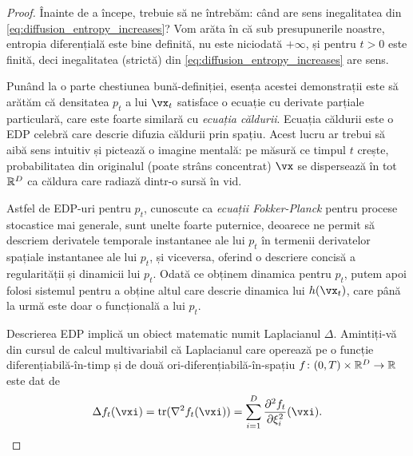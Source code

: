 \documentclass[../../book-main_ro.tex]{subfiles}
\begin{document}
\begin{proof}
    Înainte de a începe, trebuie să ne întrebăm: când are sens inegalitatea din \eqref{eq:diffusion_entropy_increases}? Vom arăta în  că sub presupunerile noastre, entropia diferențială este bine definită, nu este niciodată \(+\infty\), și pentru \(t > 0\) este finită, deci inegalitatea (strictă) din \eqref{eq:diffusion_entropy_increases} are sens.

    Punând la o parte chestiunea bună-definiției, esența acestei demonstrații este să arătăm că densitatea \(p_{t}\) a lui \(\vx_{t}\) satisface o ecuație cu derivate parțiale particulară, care este foarte similară cu \textit{ecuația căldurii}. Ecuația căldurii este o EDP celebră care descrie difuzia căldurii prin spațiu. Acest lucru ar trebui să aibă sens intuitiv și pictează o imagine mentală: pe măsură ce timpul \(t\) crește, probabilitatea din originalul (poate strâns concentrat) \(\vx\) se dispersează în tot \(\mathbb{R}^{D}\) ca căldura care radiază dintr-o sursă în vid.
    
    Astfel de EDP-uri pentru \(p_{t}\), cunoscute ca \textit{ecuații Fokker-Planck} pentru procese stocastice mai generale, sunt unelte foarte puternice, deoarece ne permit să descriem derivatele temporale instantanee ale lui \(p_{t}\) în termenii derivatelor spațiale instantanee ale lui \(p_{t}\), și viceversa, oferind o descriere concisă a regularității și dinamicii lui \(p_{t}\). Odată ce obținem dinamica pentru \(p_{t}\), putem apoi folosi sistemul pentru a obține altul care descrie dinamica lui \(h(\vx_{t})\), care până la urmă este doar o funcțională a lui \(p_{t}\).  

    Descrierea EDP implică un obiect matematic numit Laplacianul \(\Delta\). Amintiți-vă din cursul de calcul multivariabil că Laplacianul care operează pe o funcție diferențiabilă-în-timp și de două ori-diferențiabilă-în-spațiu \(f \colon (0, T) \times \mathbb{R}^{D} \to \mathbb{R}\) este dat de
    \begin{equation}
        \Delta f_{t}(\vxi) = \tr(\nabla^{2}f_{t}(\vxi)) = \sum_{i = 1}^{D}\pddv{f_{t}}{\xi_{i}}(\vxi).
    \end{equation}
    

\end{proof}
\end{document}
